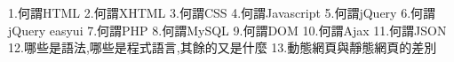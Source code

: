 1.何謂HTML
2.何謂XHTML
3.何謂CSS
4.何謂Javascript
5.何謂jQuery
6.何謂jQuery easyui
7.何謂PHP
8.何謂MySQL
9.何謂DOM
10.何謂Ajax
11.何謂JSON
12.哪些是語法,哪些是程式語言,其餘的又是什麼
13.動態網頁與靜態網頁的差別

